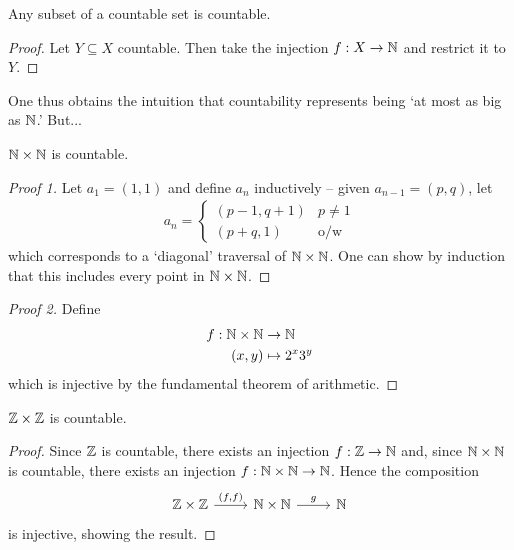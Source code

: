 \documentclass{../../template/note}
\begin{document}
    \begin{corollary}
        Any subset of a countable set is countable.
    \end{corollary}
    
    \begin{proof}
        Let \(Y \subseteq X\) countable. Then take the injection \(f: X \to \mathbb N\) and restrict it to \(Y\).
    \end{proof}

    One thus obtains the intuition that countability represents being `at most as big as \(\mathbb N\).' But...

    \begin{theorem}
        \(\mathbb N \times \mathbb N\) is countable.
    \end{theorem}
    
    \begin{proof}[Proof 1]
        Let \(a_1 = (1, 1)\) and define \(a_n\) inductively -- given \(a_{n-1} = (p, q)\), let
        \begin{align*}
            a_n = \begin{cases}
                (p-1, q+1) & p \neq 1 \\
                (p+q, 1) & \text{o/w}
            \end{cases}
        \end{align*}
        which corresponds to a `diagonal' traversal of \(\mathbb N \times \mathbb N\). One can show by induction that this includes every point in \(\mathbb N \times \mathbb N\).
    \end{proof}
    
    \begin{proof}[Proof 2]
        Define
        \begin{align*}
            f: \mathbb N \times \mathbb N &\to \mathbb N \\
            (x, y) &\mapsto 2^x3^y
        \end{align*}
        which is injective by the fundamental theorem of arithmetic.        
    \end{proof}
    
    \begin{corollary}
        \(\mathbb Z \times \mathbb Z\) is countable.
    \end{corollary}
    
    \begin{proof}
        Since \(\mathbb Z\) is countable, there exists an injection \(f: \mathbb Z \to \mathbb N\) and, since \(\mathbb N \times \mathbb N\) is countable, there exists an injection \(f: \mathbb N \times \mathbb N \to \mathbb N\). Hence the composition
        \[\begin{tikzcd}[ampersand replacement=\&]
            {\ZZ \times \ZZ} \& {\NN \times \NN} \& \NN
            \arrow["{(f, f)}", from=1-1, to=1-2]
            \arrow["g", from=1-2, to=1-3]
        \end{tikzcd}\]
        is injective, showing the result.
    \end{proof}
\end{document}
